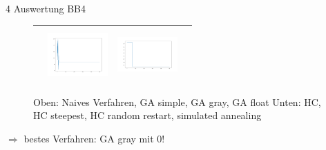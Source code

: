 \documentclass{ocbeameruni}
\begin{document}
\begin{frame}{4 Auswertung BB4}
\begin{center}
\begin{figure}
\begin{tabular}{|c|c|c|c|}
    & \includegraphics[width=23mm, height=20mm]{plots/bb4_hc_rs.png}
    & \includegraphics[width=23mm, height=20mm]{plots/bb4_sa.png} \\ \hline
    \end{tabular}
    \caption{Oben: Naives Verfahren, GA simple, GA gray, GA float \hspace{\textwidth}Unten: HC, HC steepest, HC random restart, simulated annealing}
    \end{figure}
    $\Rightarrow$ bestes Verfahren: GA gray mit 0!
    \end{center}
\end{frame}
\end{document}

